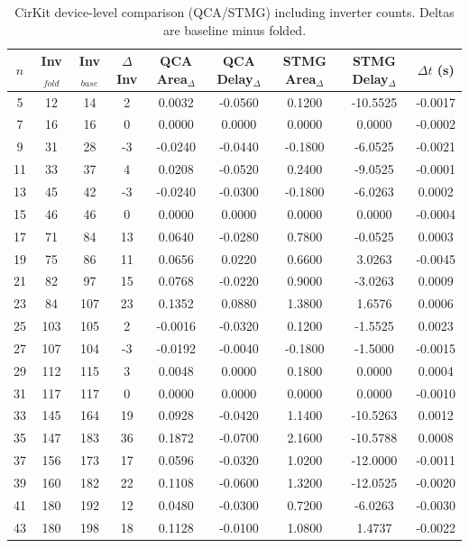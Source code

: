 \begin{table}[t]
\centering
\caption{CirKit device-level comparison (QCA/STMG) including inverter counts. Deltas are baseline minus folded.}
\label{tab:cirkit_qca_stmg}
\begin{tabular}{ccccccccc}
\hline
$n$ & Inv$_{fold}$ & Inv$_{base}$ & $\Delta$Inv & QCA Area$_{\Delta}$ & QCA Delay$_{\Delta}$ & STMG Area$_{\Delta}$ & STMG Delay$_{\Delta}$ & $\Delta t$ (s) \\
\hline
5 & 12 & 14 & 2 & 0.0032 & -0.0560 & 0.1200 & -10.5525 & -0.0017 \\
7 & 16 & 16 & 0 & 0.0000 & 0.0000 & 0.0000 & 0.0000 & -0.0002 \\
9 & 31 & 28 & -3 & -0.0240 & -0.0440 & -0.1800 & -6.0525 & -0.0021 \\
11 & 33 & 37 & 4 & 0.0208 & -0.0520 & 0.2400 & -9.0525 & -0.0001 \\
13 & 45 & 42 & -3 & -0.0240 & -0.0300 & -0.1800 & -6.0263 & 0.0002 \\
15 & 46 & 46 & 0 & 0.0000 & 0.0000 & 0.0000 & 0.0000 & -0.0004 \\
17 & 71 & 84 & 13 & 0.0640 & -0.0280 & 0.7800 & -0.0525 & 0.0003 \\
19 & 75 & 86 & 11 & 0.0656 & 0.0220 & 0.6600 & 3.0263 & -0.0045 \\
21 & 82 & 97 & 15 & 0.0768 & -0.0220 & 0.9000 & -3.0263 & 0.0009 \\
23 & 84 & 107 & 23 & 0.1352 & 0.0880 & 1.3800 & 1.6576 & 0.0006 \\
25 & 103 & 105 & 2 & -0.0016 & -0.0320 & 0.1200 & -1.5525 & 0.0023 \\
27 & 107 & 104 & -3 & -0.0192 & -0.0040 & -0.1800 & -1.5000 & -0.0015 \\
29 & 112 & 115 & 3 & 0.0048 & 0.0000 & 0.1800 & 0.0000 & 0.0004 \\
31 & 117 & 117 & 0 & 0.0000 & 0.0000 & 0.0000 & 0.0000 & -0.0010 \\
33 & 145 & 164 & 19 & 0.0928 & -0.0420 & 1.1400 & -10.5263 & 0.0012 \\
35 & 147 & 183 & 36 & 0.1872 & -0.0700 & 2.1600 & -10.5788 & 0.0008 \\
37 & 156 & 173 & 17 & 0.0596 & -0.0320 & 1.0200 & -12.0000 & -0.0011 \\
39 & 160 & 182 & 22 & 0.1108 & -0.0600 & 1.3200 & -12.0525 & -0.0020 \\
41 & 180 & 192 & 12 & 0.0480 & -0.0300 & 0.7200 & -6.0263 & -0.0030 \\
43 & 180 & 198 & 18 & 0.1128 & -0.0100 & 1.0800 & 1.4737 & -0.0022 \\

\end{tabular}
\end{table}
